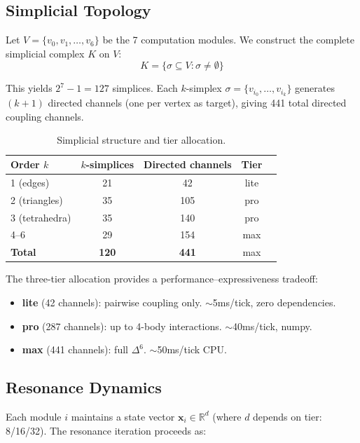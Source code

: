 \documentclass[11pt]{article}
\begin{document}
\subsection{Simplicial Topology}
\label{sec:topology}

Let $V = \{v_0, v_1, \ldots, v_6\}$ be the 7 computation modules. We construct the complete simplicial complex $K$ on $V$:
\begin{equation}
K = \{\sigma \subseteq V : \sigma \neq \emptyset\}
\end{equation}

This yields $2^7 - 1 = 127$ simplices. Each $k$-simplex $\sigma = \{v_{i_0}, \ldots, v_{i_k}\}$ generates $(k+1)$ directed channels (one per vertex as target), giving 441 total directed coupling channels.

\begin{table}[htbp]
\centering
\caption{Simplicial structure and tier allocation.}
\label{tab:tiers}
\begin{tabular}{@{}lcccc@{}}
\toprule
Order $k$ & $k$-simplices & Directed channels & Tier \\
\midrule
1 (edges) & 21 & 42 & lite \\
2 (triangles) & 35 & 105 & pro \\
3 (tetrahedra) & 35 & 140 & pro \\
4--6 & 29 & 154 & max \\
\midrule
\textbf{Total} & \textbf{120} & \textbf{441} & max \\
\bottomrule
\end{tabular}
\end{table}

The three-tier allocation provides a performance--expressiveness tradeoff:
\begin{itemize}[leftmargin=*]
\item \textbf{lite} (42 channels): pairwise coupling only. $\sim$5ms/tick, zero dependencies.
\item \textbf{pro} (287 channels): up to 4-body interactions. $\sim$40ms/tick, numpy.
\item \textbf{max} (441 channels): full $\Delta^6$. $\sim$50ms/tick CPU.
\end{itemize}

\subsection{Resonance Dynamics}
\label{sec:dynamics}

Each module $i$ maintains a state vector $\mathbf{x}_i \in \mathbb{R}^d$ (where $d$ depends on tier: 8/16/32). The resonance iteration proceeds as:
\end{document}
